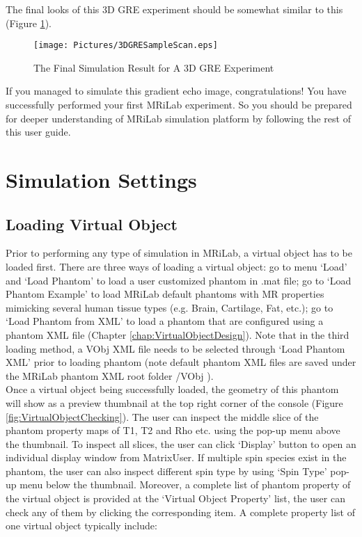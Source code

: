 \documentclass{book}%
\begin{document}
The final looks of this 3D GRE experiment should be somewhat similar to this (Figure \ref{fig:3DGRESampleScan}).


\begin{figure}[htbp]
	\centering
		\texttt{[image: Pictures/3DGRESampleScan.eps]}
	\caption{The Final Simulation Result for A 3D GRE Experiment}
	\label{fig:3DGRESampleScan}
\end{figure}

If you managed to simulate this gradient echo image, congratulations! You have successfully performed your first MRiLab experiment. So you should be prepared for deeper understanding of MRiLab simulation platform by following the rest of this user guide.


\chapter{Simulation Settings}

\section{Loading Virtual Object} \label{chap:LoadingVirtualObject}

Prior to performing any type of simulation in MRiLab, a virtual object has to be loaded first. There are three ways of loading a virtual object: go to menu `Load' and `Load Phantom' to load a user customized phantom in .mat file; go to `Load Phantom Example' to load MRiLab default phantoms with MR properties mimicking several human tissue types (e.g. Brain, Cartilage, Fat, etc.); go to `Load Phantom from XML' to load a phantom that are configured using a phantom XML file (Chapter \ref{chap:VirtualObjectDesign}). Note that in the third loading method, a VObj XML file needs to be selected through `Load Phantom XML' prior to loading phantom (note default phantom XML files are saved under the MRiLab phantom XML root folder /VObj ). \\

Once a virtual object being successfully loaded, the geometry of this phantom will show as a preview thumbnail at the top right corner of the console (Figure \ref{fig:VirtualObjectChecking}). The user can inspect the middle slice of the phantom property maps of T1, T2 and Rho etc. using the pop-up menu above the thumbnail. To inspect all slices, the user can click `Display' button to open an individual display window from MatrixUser. If multiple spin species exist in the phantom, the user can also inspect different spin type by using `Spin Type' pop-up menu below the thumbnail. Moreover, a complete list of phantom property of the virtual object is provided at the `Virtual Object Property' list, the user can check any of them by clicking the corresponding item. A complete property list of one virtual object typically include:
\end{document}
